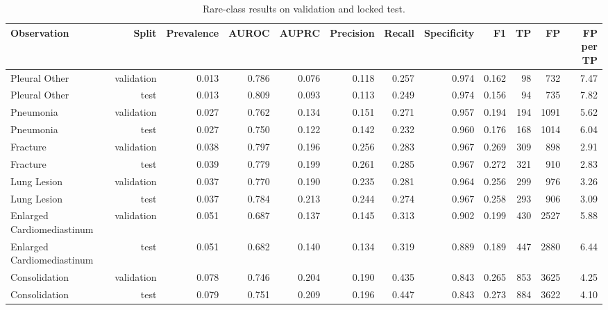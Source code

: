 \begin{table}[t]
\centering
\scriptsize
\begin{tabular}{lrrrrrrrrrrr}
\hline
Observation & Split & Prevalence & AUROC & AUPRC & Precision & Recall & Specificity & F1 & TP & FP & FP per TP \\
\hline
Pleural Other & validation & 0.013 & 0.786 & 0.076 & 0.118 & 0.257 & 0.974 & 0.162 & 98 & 732 & 7.47 \\
Pleural Other & test & 0.013 & 0.809 & 0.093 & 0.113 & 0.249 & 0.974 & 0.156 & 94 & 735 & 7.82 \\
Pneumonia & validation & 0.027 & 0.762 & 0.134 & 0.151 & 0.271 & 0.957 & 0.194 & 194 & 1091 & 5.62 \\
Pneumonia & test & 0.027 & 0.750 & 0.122 & 0.142 & 0.232 & 0.960 & 0.176 & 168 & 1014 & 6.04 \\
Fracture & validation & 0.038 & 0.797 & 0.196 & 0.256 & 0.283 & 0.967 & 0.269 & 309 & 898 & 2.91 \\
Fracture & test & 0.039 & 0.779 & 0.199 & 0.261 & 0.285 & 0.967 & 0.272 & 321 & 910 & 2.83 \\
Lung Lesion & validation & 0.037 & 0.770 & 0.190 & 0.235 & 0.281 & 0.964 & 0.256 & 299 & 976 & 3.26 \\
Lung Lesion & test & 0.037 & 0.784 & 0.213 & 0.244 & 0.274 & 0.967 & 0.258 & 293 & 906 & 3.09 \\
Enlarged Cardiomediastinum & validation & 0.051 & 0.687 & 0.137 & 0.145 & 0.313 & 0.902 & 0.199 & 430 & 2527 & 5.88 \\
Enlarged Cardiomediastinum & test & 0.051 & 0.682 & 0.140 & 0.134 & 0.319 & 0.889 & 0.189 & 447 & 2880 & 6.44 \\
Consolidation & validation & 0.078 & 0.746 & 0.204 & 0.190 & 0.435 & 0.843 & 0.265 & 853 & 3625 & 4.25 \\
Consolidation & test & 0.079 & 0.751 & 0.209 & 0.196 & 0.447 & 0.843 & 0.273 & 884 & 3622 & 4.10 \\
\hline
\end{tabular}
\caption{Rare-class results on validation and locked test.}
\label{tab:table4_rare_class_results}
\end{table}
